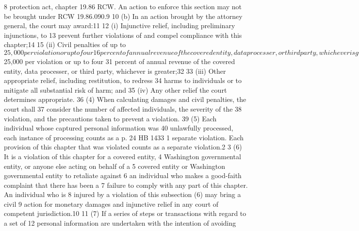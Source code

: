 8 protection act, chapter 19.86 RCW. An action to enforce this section
may not be brought under RCW 19.86.090.9
10 (b) In an action brought by the attorney general, the court may
award:11
12 (i) Injunctive relief, including preliminary injunctions, to
13 prevent further violations of and compel compliance with this
chapter;14
15 (ii) Civil penalties of up to $25,000 per violation or up to four
16 percent of annual revenue of the covered entity, data processer, or
third party, whichever is greater;17
18 (iii) Other appropriate relief, including restitution, to redress
19 harms to individuals or to mitigate all substantial risk of harm; and
20 (iv) Any other relief the court determines appropriate.
21 (3)(a) A city attorney or county prosecutor in a city or county
22 having a population in excess of 200,000, may bring an action to
23 enforce this chapter on behalf of the residents of such city or
county.24
25 (b) In an action brought by a district attorney or a city
attorney, the court may award:26
27 (i) Injunctive relief, including preliminary injunctions, to
28 prevent further violations of and compel compliance with this
chapter;29
30 (ii) Civil penalties of up to $25,000 per violation or up to four
31 percent of annual revenue of the covered entity, data processer, or
third party, whichever is greater;32
33 (iii) Other appropriate relief, including restitution, to redress
34 harms to individuals or to mitigate all substantial risk of harm; and
35 (iv) Any other relief the court determines appropriate.
36 (4) When calculating damages and civil penalties, the court shall
37 consider the number of affected individuals, the severity of the
38 violation, and the precautions taken to prevent a violation.
39 (5) Each individual whose captured personal information was
40 unlawfully processed, each instance of processing counts as a
p. 24 HB 1433
1 separate violation. Each provision of this chapter that was violated
counts as a separate violation.2
3 (6) It is a violation of this chapter for a covered entity,
4 Washington governmental entity, or anyone else acting on behalf of a
5 covered entity or Washington governmental entity to retaliate against
6 an individual who makes a good-faith complaint that there has been a
7 failure to comply with any part of this chapter. An individual who is
8 injured by a violation of this subsection (6) may bring a civil
9 action for monetary damages and injunctive relief in any court of
competent jurisdiction.10
11 (7) If a series of steps or transactions with regard to a set of
12 personal information are undertaken with the intention of avoiding
